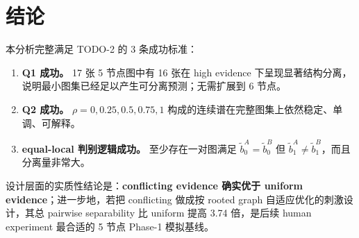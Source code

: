 \documentclass[11pt,a4paper]{ctexart}
\begin{document}
\section{结论}

本分析完整满足 TODO-2 的 3 条成功标准：
\begin{enumerate}
    \item \textbf{Q1 成功。} 17 张 5 节点图中有 16 张在 high evidence 下呈现显著结构分离，说明最小图集已经足以产生可分离预测；无需扩展到 6 节点。
    \item \textbf{Q2 成功。} $\rho=0,0.25,0.5,0.75,1$ 构成的连续谱在完整图集上依然稳定、单调、可解释。
    \item \textbf{equal-local 判别逻辑成功。} 至少存在一对图满足 $\tilde b_0^A=\tilde b_0^B$ 但 $\tilde b_1^A\neq\tilde b_1^B$，而且分离量非常大。
\end{enumerate}

设计层面的实质性结论是：\textbf{conflicting evidence 确实优于 uniform evidence}；进一步地，若把 conflicting 做成按 rooted graph 自适应优化的刺激设计，其总 pairwise separability 比 uniform 提高 3.74 倍，是后续 human experiment 最合适的 5 节点 Phase-1 模拟基线。
\end{document}

